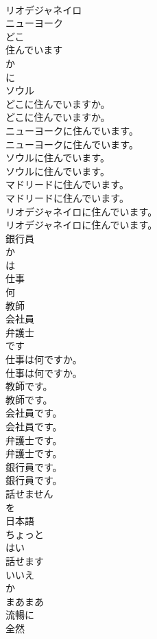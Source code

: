 \documentclass[8pt]{extreport}
\begin{document}
\begin{CJK}{UTF8}{min}
\\	リオデジャネイロ
\\	ニューヨーク
\\	どこ
\\	住んでいます
\\	か
\\	に
\\	ソウル
\\	どこに住んでいますか。	
\\	どこに住んでいますか。 
\\	ニューヨークに住んでいます。	
\\	ニューヨークに住んでいます。 
\\	ソウルに住んでいます。	
\\	ソウルに住んでいます。 
\\	マドリードに住んでいます。	
\\	マドリードに住んでいます。 
\\	リオデジャネイロに住んでいます。	
\\	リオデジャネイロに住んでいます。 
\\	銀行員
\\	か
\\	は
\\	仕事
\\	何
\\	教師
\\	会社員
\\	弁護士
\\	です
\\	仕事は何ですか。	
\\	仕事は何ですか。 
\\	教師です。	
\\	教師です。 
\\	会社員です。	
\\	会社員です。 
\\	弁護士です。	
\\	弁護士です。 
\\	銀行員です。	
\\	銀行員です。 
\\	話せません
\\	を
\\	日本語
\\	ちょっと
\\	はい
\\	話せます
\\	いいえ
\\	か
\\	まあまあ
\\	流暢に
\\	全然

\end{CJK}
\end{document}
